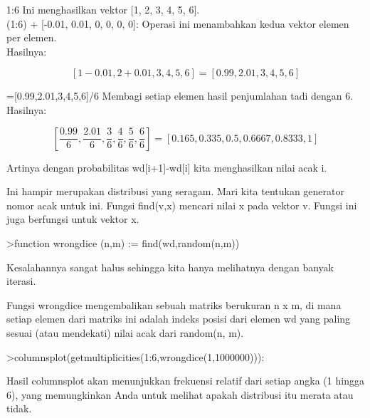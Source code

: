 \documentclass[a4paper,10pt]{article}
\begin{document}
\begin{eulernotebook}
\begin{eulercomment}
\begin{eulercomment}
\begin{eulercomment}
1:6 Ini menghasilkan vektor [1, 2, 3, 4, 5, 6].\\
(1:6) + [-0.01, 0.01, 0, 0, 0, 0]: Operasi ini menambahkan kedua
vektor elemen per elemen.\\
Hasilnya: \\
\end{eulercomment}
\begin{eulerformula}
\[
[1-0.01, 2+0.01, 3, 4, 5, 6] = [0.99, 2.01, 3, 4, 5, 6]
\]
\end{eulerformula}
\begin{eulercomment}
[1-0.01,2+0.01,3,4,5,6]=[0.99,2.01,3,4,5,6]/6 Membagi setiap elemen
hasil penjumlahan tadi dengan 6.\\
Hasilnya:\\
\end{eulercomment}
\begin{eulerformula}
\[
[\frac {0.99}{6}, \frac {2.01}{6}, \frac {3}{6}, \frac {4}{6}, \frac {5}{6}, \frac {6}{6}] = [0.165, 0.335, 0.5,0.6667, 0.8333, 1]
\]
\end{eulerformula}
\begin{eulercomment}
Artinya dengan probabilitas wd[i+1]-wd[i] kita menghasilkan nilai acak
i.

Ini hampir merupakan distribusi yang seragam. Mari kita tentukan
generator nomor acak untuk ini. Fungsi find(v,x) mencari nilai x pada
vektor v. Fungsi ini juga berfungsi untuk vektor x.
\end{eulercomment}
\begin{eulerprompt}
>function wrongdice (n,m) := find(wd,random(n,m))
\end{eulerprompt}
\begin{eulercomment}
Kesalahannya sangat halus sehingga kita hanya melihatnya dengan banyak
iterasi.

Fungsi wrongdice mengembalikan sebuah matriks berukuran n x m, di mana
setiap elemen dari matriks ini adalah indeks posisi dari elemen wd
yang paling sesuai (atau mendekati) nilai acak dari random(n, m).
\end{eulercomment}
\begin{eulerprompt}
>columnsplot(getmultiplicities(1:6,wrongdice(1,1000000))):
\end{eulerprompt}
\begin{eulercomment}
Hasil columnsplot akan menunjukkan frekuensi relatif dari setiap angka
(1 hingga 6), yang memungkinkan Anda untuk melihat apakah distribusi
itu merata atau tidak.


\end{eulercomment}
\end{eulercomment}
\end{eulercomment}
\end{eulernotebook}
\end{document}
